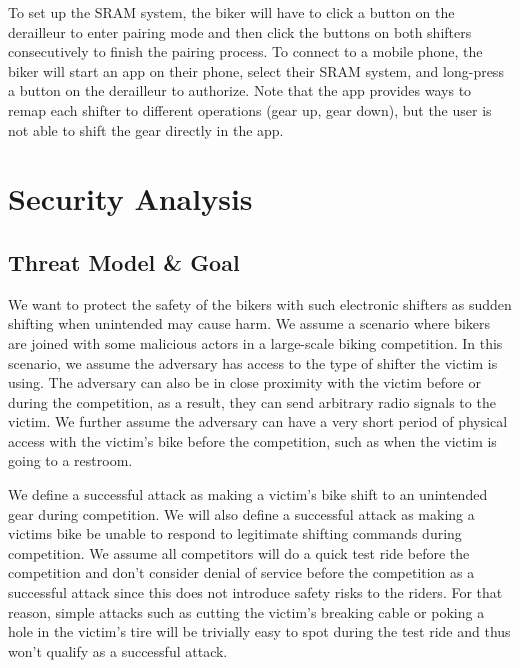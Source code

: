 \documentclass[letterpaper,twocolumn,10pt]{article}
\begin{document}
To set up the SRAM system, the biker will have to click a button on the derailleur to enter pairing mode and then click the buttons on both shifters consecutively to finish the pairing process. To connect to a mobile phone, the biker will start an app on their phone, select their SRAM system, and long-press a button on the derailleur to authorize. Note that the app provides ways to remap each shifter to different operations (gear up, gear down), but the user is not able to shift the gear directly in the app.




\section{Security Analysis}



\subsection{Threat Model \& Goal}
We want to protect the safety of the bikers with such electronic shifters as sudden shifting when unintended may cause harm. We assume a scenario where bikers are joined with some malicious actors in a large-scale biking competition. In this scenario, we assume the adversary has access to the type of shifter the victim is using. The adversary can also be in close proximity with the victim before or during the competition, as a result, they can send arbitrary radio signals to the victim. We further assume the adversary can have a very short period of physical access with the victim's bike before the competition, such as when the victim is going to a restroom.

We define a successful attack as making a victim's bike shift to an unintended gear during competition. We will also define a successful attack as making a victims bike be unable to respond to legitimate shifting commands during competition. We assume all competitors will do a quick test ride before the competition and don't consider denial of service before the competition as a successful attack since this does not introduce safety risks to the riders. For that reason, simple attacks such as cutting the victim's breaking cable or poking a hole in the victim's tire will be trivially easy to spot during the test ride and thus won't qualify as a successful attack.
\end{document}
